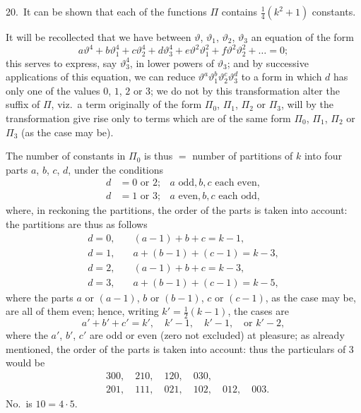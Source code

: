 \documentclass[11pt,a4paper]{book}
\begin{document}
\medskip

20.\ It can be shown that each of the functions $\Pi$ contains $\frac{1}{4}(k^2 + 1)$ constants.

It will be recollected that we have between $\vartheta$, $\vartheta_1$, $\vartheta_2$, $\vartheta_3$ an equation of the form
\[
a\vartheta^4 + b\vartheta_1^4 + c\vartheta_2^4 + d\vartheta_3^4 + e\vartheta^2\vartheta_1^2 + f\vartheta^2\vartheta_2^2 + \ldots = 0;
\]
this serves to express, say $\vartheta_3^4$, in lower powers of $\vartheta_3$; and by successive applications of this equation, we can reduce $\vartheta^a\vartheta_1^b\vartheta_2^c\vartheta_3^d$ to a form in which $d$ has only one of the values $0$, $1$, $2$ or $3$; we do not by this transformation alter the suffix of $\Pi$, viz.\ a term originally of the form $\Pi_0$, $\Pi_1$, $\Pi_2$ or $\Pi_3$, will by the transformation give rise only to terms which are of the same form $\Pi_0$, $\Pi_1$, $\Pi_2$ or $\Pi_3$ (as the case may be).

The number of constants in $\Pi_0$ is thus $=$ number of partitions of $k$ into four parts $a$, $b$, $c$, $d$, under the conditions
\begin{align*}
d &= 0 \text{ or } 2; & a \text{ odd}, b, c \text{ each even},\\
d &= 1 \text{ or } 3; & a \text{ even}, b, c \text{ each odd},
\end{align*}
where, in reckoning the partitions, the order of the parts is taken into account:
the partitions are thus as follows
\begin{align*}
d = 0, &\quad (a - 1) + b + c = k - 1,\\
d = 1, &\quad a + (b - 1) + (c - 1) = k - 3,\\
d = 2, &\quad (a - 1) + b + c = k - 3,\\
d = 3, &\quad a + (b - 1) + (c - 1) = k - 5,
\end{align*}
where the parts $a$ or $(a - 1)$, $b$ or $(b - 1)$, $c$ or $(c - 1)$, as the case may be, are all of them even; hence, writing $k' = \frac{1}{2}(k - 1)$, the cases are
\[
a' + b' + c' = k', \quad k' - 1, \quad k' - 1, \quad \text{or } k' - 2,
\]
where the $a'$, $b'$, $c'$ are odd or even (zero not excluded) at pleasure; as already mentioned, the order of the parts is taken into account: thus the particulars of $3$ would be
\begin{align*}
&300, \quad 210, \quad 120, \quad 030,\\
&201, \quad 111, \quad 021, \quad 102, \quad 012, \quad 003.
\end{align*}
No.\ is $10 = 4 \cdot 5$.
\end{document}
